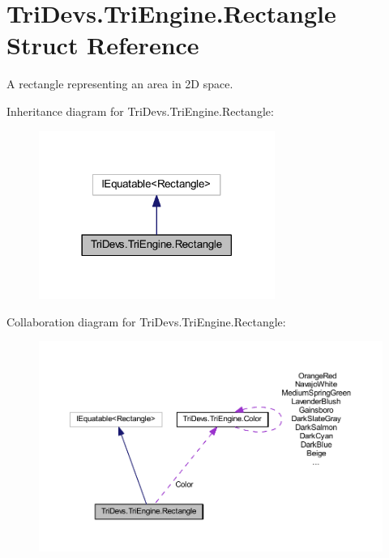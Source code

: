 \hypertarget{struct_tri_devs_1_1_tri_engine_1_1_rectangle}{\section{Tri\-Devs.\-Tri\-Engine.\-Rectangle Struct Reference}
\label{struct_tri_devs_1_1_tri_engine_1_1_rectangle}
}


A rectangle representing an area in 2\-D space.  




Inheritance diagram for Tri\-Devs.\-Tri\-Engine.\-Rectangle\-:
\nopagebreak
\begin{figure}[H]
\begin{center}
\leavevmode
\includegraphics[width=218pt]{struct_tri_devs_1_1_tri_engine_1_1_rectangle__inherit__graph}
\end{center}
\end{figure}


Collaboration diagram for Tri\-Devs.\-Tri\-Engine.\-Rectangle\-:
\nopagebreak
\begin{figure}[H]
\begin{center}
\leavevmode
\includegraphics[width=350pt]{struct_tri_devs_1_1_tri_engine_1_1_rectangle__coll__graph}
\end{center}
\end{figure}
